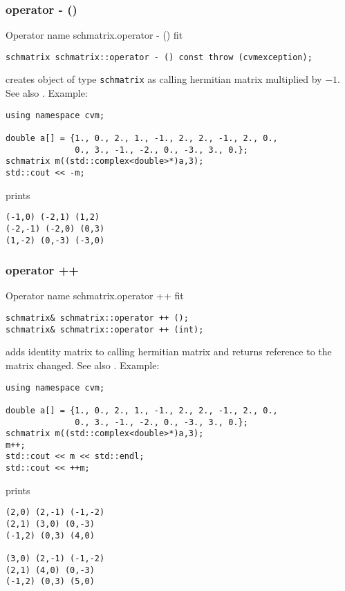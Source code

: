 \subsubsection{operator - ()}
Operator%
\pdfdest name {schmatrix.operator - ()} fit
\begin{verbatim}
schmatrix schmatrix::operator - () const throw (cvmexception);
\end{verbatim}
creates  object of type \verb"schmatrix" as
 calling hermitian matrix multiplied by $-1$.
See also .
Example:
\begin{Verbatim}
using namespace cvm;

double a[] = {1., 0., 2., 1., -1., 2., 2., -1., 2., 0.,
              0., 3., -1., -2., 0., -3., 3., 0.};
schmatrix m((std::complex<double>*)a,3);
std::cout << -m;
\end{Verbatim}
prints
\begin{Verbatim}
(-1,0) (-2,1) (1,2)
(-2,-1) (-2,0) (0,3)
(1,-2) (0,-3) (-3,0)
\end{Verbatim}
\newpage



\subsubsection{operator ++}
Operator%
\pdfdest name {schmatrix.operator ++} fit
\begin{verbatim}
schmatrix& schmatrix::operator ++ ();
schmatrix& schmatrix::operator ++ (int);
\end{verbatim}
adds identity matrix to  calling hermitian matrix
and returns  reference to
the matrix changed.
See also .
Example:
\begin{Verbatim}
using namespace cvm;

double a[] = {1., 0., 2., 1., -1., 2., 2., -1., 2., 0.,
              0., 3., -1., -2., 0., -3., 3., 0.};
schmatrix m((std::complex<double>*)a,3);
m++;
std::cout << m << std::endl;
std::cout << ++m;
\end{Verbatim}
prints
\begin{Verbatim}
(2,0) (2,-1) (-1,-2)
(2,1) (3,0) (0,-3)
(-1,2) (0,3) (4,0)

(3,0) (2,-1) (-1,-2)
(2,1) (4,0) (0,-3)
(-1,2) (0,3) (5,0)
\end{Verbatim}
\newpage



